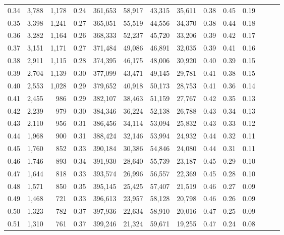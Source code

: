 \begin{tabular}{rrrrrrrrrrrrrr}
0.34 &   3,788 &  1,178 &  0.24 &  361,653 &   58,917 &  43,315 &  35,611 &  0.38 &  0.45 &      0.19 \\
0.35 &   3,398 &  1,241 &  0.27 &  365,051 &   55,519 &  44,556 &  34,370 &  0.38 &  0.44 &      0.18 \\
0.36 &   3,282 &  1,164 &  0.26 &  368,333 &   52,237 &  45,720 &  33,206 &  0.39 &  0.42 &      0.17 \\
0.37 &   3,151 &  1,171 &  0.27 &  371,484 &   49,086 &  46,891 &  32,035 &  0.39 &  0.41 &      0.16 \\
0.38 &   2,911 &  1,115 &  0.28 &  374,395 &   46,175 &  48,006 &  30,920 &  0.40 &  0.39 &      0.15 \\
0.39 &   2,704 &  1,139 &  0.30 &  377,099 &   43,471 &  49,145 &  29,781 &  0.41 &  0.38 &      0.15 \\
0.40 &   2,553 &  1,028 &  0.29 &  379,652 &   40,918 &  50,173 &  28,753 &  0.41 &  0.36 &      0.14 \\
0.41 &   2,455 &    986 &  0.29 &  382,107 &   38,463 &  51,159 &  27,767 &  0.42 &  0.35 &      0.13 \\
0.42 &   2,239 &    979 &  0.30 &  384,346 &   36,224 &  52,138 &  26,788 &  0.43 &  0.34 &      0.13 \\
0.43 &   2,110 &    956 &  0.31 &  386,456 &   34,114 &  53,094 &  25,832 &  0.43 &  0.33 &      0.12 \\
0.44 &   1,968 &    900 &  0.31 &  388,424 &   32,146 &  53,994 &  24,932 &  0.44 &  0.32 &      0.11 \\
0.45 &   1,760 &    852 &  0.33 &  390,184 &   30,386 &  54,846 &  24,080 &  0.44 &  0.31 &      0.11 \\
0.46 &   1,746 &    893 &  0.34 &  391,930 &   28,640 &  55,739 &  23,187 &  0.45 &  0.29 &      0.10 \\
0.47 &   1,644 &    818 &  0.33 &  393,574 &   26,996 &  56,557 &  22,369 &  0.45 &  0.28 &      0.10 \\
0.48 &   1,571 &    850 &  0.35 &  395,145 &   25,425 &  57,407 &  21,519 &  0.46 &  0.27 &      0.09 \\
0.49 &   1,468 &    721 &  0.33 &  396,613 &   23,957 &  58,128 &  20,798 &  0.46 &  0.26 &      0.09 \\
0.50 &   1,323 &    782 &  0.37 &  397,936 &   22,634 &  58,910 &  20,016 &  0.47 &  0.25 &      0.09 \\
0.51 &   1,310 &    761 &  0.37 &  399,246 &   21,324 &  59,671 &  19,255 &  0.47 &  0.24 &      0.08 \\

\end{tabular}
